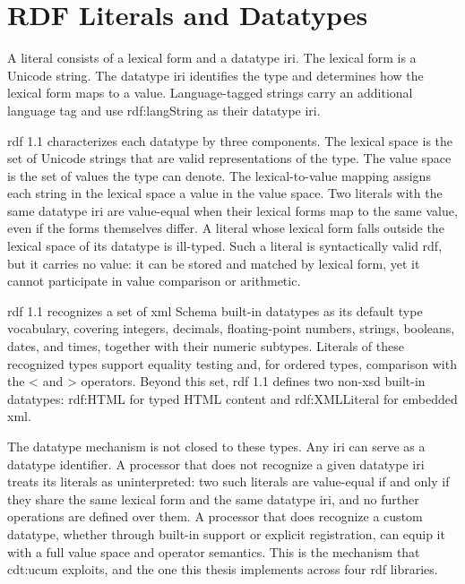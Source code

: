 \section{RDF Literals and Datatypes}

A literal consists of a lexical form and a datatype \ac{iri}. The lexical form is a Unicode string. The datatype \ac{iri} identifies the type and determines how the lexical form maps to a value. Language-tagged strings carry an additional language tag and use \textsf{rdf:langString} as their datatype \ac{iri}.

\ac{rdf} 1.1 characterizes each datatype by three components. The lexical space is the set of Unicode strings that are valid representations of the type. The value space is the set of values the type can denote. The lexical-to-value mapping assigns each string in the lexical space a value in the value space. Two literals with the same datatype \ac{iri} are value-equal when their lexical forms map to the same value, even if the forms themselves differ. A literal whose lexical form falls outside the lexical space of its datatype is ill-typed. Such a literal is syntactically valid \ac{rdf}, but it carries no value: it can be stored and matched by lexical form, yet it cannot participate in value comparison or arithmetic.

\ac{rdf} 1.1 recognizes a set of \ac{xml} Schema built-in datatypes as its default type vocabulary, covering integers, decimals, floating-point numbers, strings, booleans, dates, and times, together with their numeric subtypes. Literals of these recognized types support equality testing and, for ordered types, comparison with the < and > operators. Beyond this set, \ac{rdf} 1.1 defines two non-\ac{xsd} built-in datatypes: \textsf{rdf:HTML} for typed HTML content and \textsf{rdf:XMLLiteral} for embedded \ac{xml}.

The datatype mechanism is not closed to these types. Any \ac{iri} can serve as a datatype identifier. A processor that does not recognize a given datatype \ac{iri} treats its literals as uninterpreted: two such literals are value-equal if and only if they share the same lexical form and the same datatype \ac{iri}, and no further operations are defined over them. A processor that does recognize a custom datatype, whether through built-in support or explicit registration, can equip it with a full value space and operator semantics. This is the mechanism that \textsf{cdt:ucum} exploits, and the one this thesis implements across four \ac{rdf} libraries.

